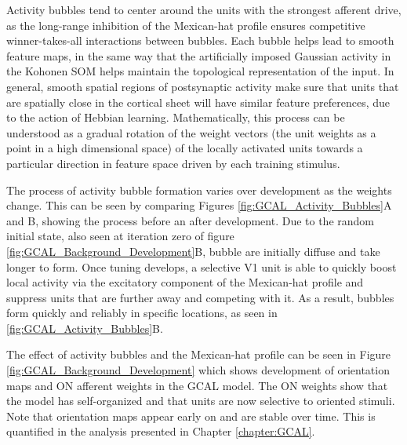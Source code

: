 \documentclass[phd,ianc,twoside]{infthesis}
\begin{document}
Activity bubbles tend to center around the units with the strongest
afferent drive, as the long-range inhibition of the Mexican-hat profile
ensures competitive winner-takes-all interactions between bubbles. Each
bubble helps lead to smooth feature maps, in the same way that the
artificially imposed Gaussian activity in the Kohonen SOM helps maintain
the topological representation of the input. In general, smooth spatial
regions of postsynaptic activity make sure that units that are spatially
close in the cortical sheet will have similar feature preferences, due
to the action of Hebbian learning. Mathematically, this process can be
understood as a gradual rotation of the weight vectors (the unit weights
as a point in a high dimensional space) of the locally activated units
towards a particular direction in feature space driven by each training
stimulus.

The process of activity bubble formation varies over development as the
weights change. This can be seen by comparing Figures
\ref{fig:GCAL_Activity_Bubbles}A and B, showing the process before an
after development. Due to the random initial state, also seen at
iteration zero of figure \ref{fig:GCAL_Background_Development}B, bubble
are initially diffuse and take longer to form. Once tuning develops, a
selective V1 unit is able to quickly boost local activity via the
excitatory component of the Mexican-hat profile and suppress units that
are further away and competing with it. As a result, bubbles form
quickly and reliably in specific locations, as seen in
\ref{fig:GCAL_Activity_Bubbles}B. 

The effect of activity bubbles and the Mexican-hat profile can be seen
in Figure \ref{fig:GCAL_Background_Development} which shows development
of orientation maps and ON afferent weights in the GCAL model. The ON
weights show that the model has self-organized and that units are now
selective to oriented stimuli. Note that orientation maps appear early
on and are stable over time. This is quantified in the analysis
presented in Chapter \ref{chapter:GCAL}.
\end{document}
